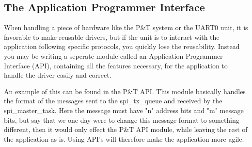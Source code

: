 \subsection{The Application Programmer Interface}
\label{sec:TheApplicationProgrammerInterface}

When handling a piece of hardware like the P\&T system or the UART0 unit, it is favorable to make reusable drivers, but if the unit is to interact with the application following specific protocols, you quickly lose the reusability. 
Instead you may be writing a seperate module called an Application Programmer Interface (API), containing all the features necessary, for the application to handle the driver easily and correct.

An example of this can be found in the P\&T API. This module basically handles the format of the messages sent to the spi\_tx\_queue and received by the spi\_master\_task. Here the message must have "n" address bits and "m" message bits, but say that we one day were to change this message format to something different, then it would only effect the P\&T API module, while leaving the rest of the application as is. Using API's will therefore make the application more agile. 


